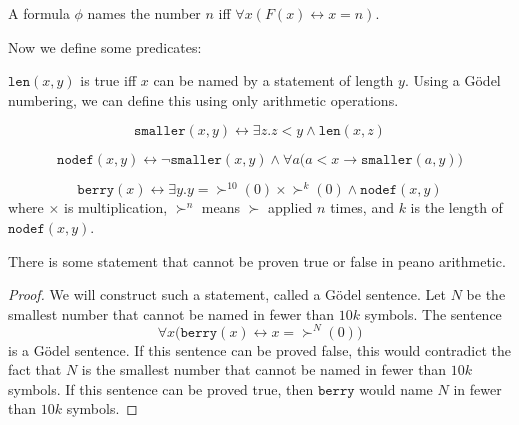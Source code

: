 \documentclass{scrbook}
\renewcommand{\implies}{\to}
\renewcommand{\iff}{\leftrightarrow}
\begin{document}
\begin{defn}[names]
  A formula $\phi$ names the number $n$ iff $\forall x (F(x)\iff x=n)$. 
\end{defn}
Now we define some predicates:
\newcommand{\namelen}{\texttt{len}}
\begin{defn}[\namelen]
  $\namelen(x,y)$ is true iff $x$ can be named by a statement of length $y$. Using a Gödel numbering, we can define this using only arithmetic operations. 
\end{defn}
\newcommand{\namesmaller}{\texttt{smaller}}
\begin{defn}[\namesmaller]
  \[
  \namesmaller(x,y)\iff \exists z .z < y \wedge \namelen(x,z)
  \]
\end{defn}
\newcommand{\minnodef}{\texttt{nodef}}
\begin{defn}[\minnodef]
  \[
  \minnodef(x,y)\iff \neg \namesmaller(x,y) \wedge \forall a \bigl(a < x \implies \namesmaller(a,y)\bigr)
  \]
\end{defn}
\newcommand{\berry}{\texttt{berry}}
\begin{defn}[\berry]
  \[
  \berry(x) \iff\exists y. y=\succ^{10}(0)\times \succ^{k}(0)\wedge \minnodef(x,y)
  \]
  where $\times$ is multiplication, $\succ^n$ means $\succ$ applied $n$ times, and $k$ is the length of $\minnodef(x,y)$. 
\end{defn}
\begin{theorem}
  There is some statement that cannot be proven true or false in peano arithmetic.
\end{theorem}
\begin{proof}
  We will construct such a statement, called a Gödel sentence. Let $N$ be the smallest number that cannot be named in fewer than $10k$ symbols. The sentence 
  \begin{equation}
    \label{eq:godel-sentence}
    \forall x \bigl(\berry (x) \iff x= \succ^N(0)\bigr)
  \end{equation}
  is a Gödel sentence. If this sentence can be proved false, this would contradict the fact that $N$ is the smallest number that cannot be named in fewer than $10k$ symbols. If this sentence can be proved true, then $\berry$ would name $N$ in fewer than $10k$ symbols. 
\end{proof}

\printbibliography
\end{document}
